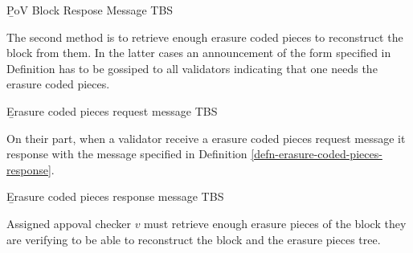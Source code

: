 \begin{definition}
  \label{defn-pov-block-response}
        {\b PoV Block Respose} Message TBS
\end{definition}

The second method is to retrieve enough erasure coded pieces to reconstruct the
block from them. In the latter cases an announcement of the form specified in
Definition has to be gossiped to all validators indicating that one needs the
erasure coded pieces.

\begin{definition}
  \label{defn-erasure-coded-pieces-request}
        {\b Erasure coded pieces request message} TBS
\end{definition}

On their part, when a validator  receive a erasure coded pieces request message
it response with the message specified in Definition
\ref{defn-erasure-coded-pieces-response}.

\begin{definition}
  \label{defn-erasure-coded-pieces-response}
        {\b Erasure coded pieces response message} TBS
\end{definition}

Assigned appoval checker $v$ must retrieve enough erasure pieces of the block
they are verifying to be able to reconstruct the block and the erasure pieces
tree.




